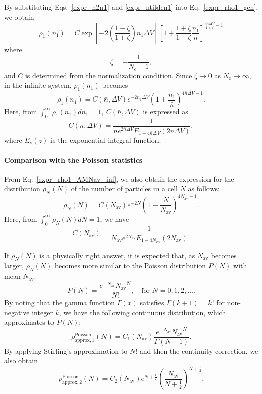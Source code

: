\documentclass{article}
\newcommand{\dV}{{\Delta V}}
\newcommand{\Nc}{{N_\mathrm{c}}}
\newcommand{\nb}{\bar{n}}
\newcommand{\Nav}{{N_\mathrm{av}}}
\begin{document}
By substituting Eqs.~\eqref{expr_n2n1} and \eqref{expr_ntilden1} into Eq.~\eqref{expr_rho1_gen}, we obtain
\begin{equation}
\label{expr_rho1_AMNav}
\rho_1(n_1)=C\exp\left[-2\left(\frac{1-\zeta}{1+\zeta}\right)n_1\dV\right]\left[1+\frac{1+\zeta}{1-\zeta}\frac{n_1}{\nb}\right]^{\frac{4\nb\dV}{1+\zeta}-1}
\end{equation}
where
\begin{equation}
\zeta = -\frac{1}{\Nc-1},
\end{equation}
and $C$ is determined from the normalization condition.
Since $\zeta\rightarrow 0$ as $\Nc\rightarrow\infty$, in the infinite system, $\rho_1(n_1)$ becomes
\begin{equation}
\label{expr_rho1_AMNav_inf}
\rho_1(n_1) = C(\nb,\dV)e^{-2n_1\dV}\left(1+\frac{n_1}{\nb}\right)^{4\nb\dV-1}.
\end{equation}
Here, from $\int_0^\infty\rho_1(n_1)dn_1=1$, $C(\nb,\dV)$ is expressed as
\begin{equation}
C(\nb,\dV)=\frac{1}{\nb e^{2\nb\dV} E_{1-4\nb\dV}(2\nb\dV)},
\end{equation}
where $E_\nu(z)$ is the exponential integral function.

\paragraph{Comparison with the Poisson statistics}

From Eq.~\eqref{expr_rho1_AMNav_inf}, we also obtain the expression for the distribution $\rho_N(N)$ of the number of particles in a cell $N$ as follows:
\begin{equation}
\label{rhoN}
\rho_N(N)=C(\Nav)e^{-2N}\left(1+\frac{N}{\Nav}\right)^{4\Nav-1}.
\end{equation}
Here, from $\int_0^\infty \rho_N(N)dN=1$, we have
\begin{equation}
C(\Nav)=\frac{1}{\Nav e^{2\Nav}E_{1-4\Nav}(2\Nav)}.
\end{equation}

If $\rho_N(N)$ is a physically right answer, it is expected that, as $\Nav$ becomes larger, $\rho_N(N)$ becomes more similar to the Poisson distribution $P(N)$ with mean $\Nav$:
\begin{equation}
\label{Poisson}
P(N)=\frac{e^{-\Nav}\Nav^N}{N!},\quad\mbox{for $N=0,1,2,\dots$}.
\end{equation}
By noting that the gamma function $\Gamma(x)$ satisfies $\Gamma(k+1)=k!$ for non-negative integer $k$, we have the following continuous distribution, which approximates to $P(N)$: 
\begin{equation}
\label{Papprox1}
\rho^\mathrm{Poisson}_\mathrm{approx,1}(N)=C_1(\Nav)\frac{e^{-\Nav}\Nav^N}{\Gamma(N+1)}.
\end{equation}
By applying Stirling's approximation to $N!$ and then the continuity correction, we also obtain
\begin{equation}
\label{Papprox2}
\rho^\mathrm{Poisson}_\mathrm{approx,2}(N)=C_2(\Nav)e^{N+\frac12}\left(\frac{\Nav}{N+\frac12}\right)^{N+\frac12}.
\end{equation}
\end{document}
